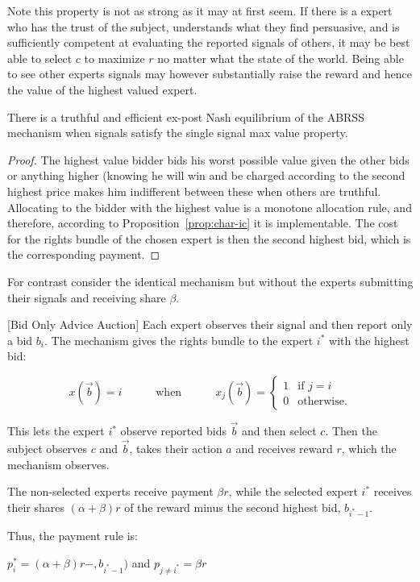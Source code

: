 Note this property is not as strong as it may at first seem. If there is a expert who has the trust of the subject, understands what they find persuasive, and is sufficiently competent at evaluating the reported signals of others, it may be best able to select $c$ to maximize $r$ no matter what the state of the world. Being able to see other experts signals may however substantially raise the reward and hence the value of the highest valued expert.  


\begin{thm}
	There is a truthful and efficient ex-post Nash equilibrium of the ABRSS mechanism when signals satisfy the single signal max value property.
\end{thm}

\begin{proof}
	The highest value bidder bids his worst possible value given the other bids or anything higher (knowing he will win and be charged according to the second highest price makes him indifferent between these when others are truthful.
	Allocating to the bidder with the highest value is a monotone allocation rule, and therefore, according to Proposition~\ref{prop:char-ic} it is implementable. The cost for the rights bundle of the chosen expert is then the second highest bid, which is the corresponding payment.
\end{proof}



For contrast consider the identical mechanism but without the experts submitting their signals and receiving share $\beta$. 
 
\begin{mech}\label{mech:BidOnly}[Bid Only Advice Auction]
 	Each expert observes their signal and then report only a bid $b_i$. The mechanism gives the rights bundle to the expert $i^*$ with the highest bid:
 	
 	$$x(\vec{b}) = i \quad \quad\quad \text{when} \quad\quad\quad x_j(\vec{b}) = \begin{cases} 1 & \text{if } j=i \\ 0 & \text{otherwise.} \end{cases}$$
 	
 	This lets the expert $i^*$ observe reported bids $\vec{b}$ and then select $c$.
 	Then the subject observes $c$ and $\vec{b}$, takes their action $a$ and receives reward $r$, which the mechanism observes. 
 	
 	The non-selected experts receive  payment $\beta r$, while the selected expert $i^*$ receives their shares $(\alpha + \beta) r$ of the reward minus the second highest bid, $b_{i^*-1}$.
 	
 	Thus, the payment rule is:
 	
 	$p_i^*= (\alpha + \beta)r - ,b_{i^*-1})$ and $p_{j\neq i^*} = \beta r$
 \end{mech}
 
